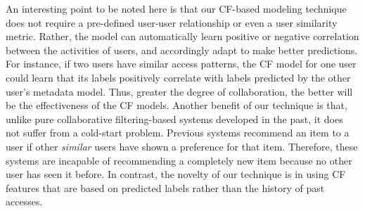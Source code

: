 An interesting point to be noted here is that our CF-based modeling
technique does not require a pre-defined user-user relationship or
even a user similarity metric.  Rather, the model can automatically learn
positive or negative correlation between the activities of users, and
accordingly adapt to make better predictions.  For instance, if two
users have similar access patterns, the CF model for one user could
learn that its labels positively correlate with labels predicted by
the other user's metadata model.  Thus, greater the degree of
collaboration, the better will be the effectiveness of the CF models.
Another benefit of our technique is that, unlike pure collaborative
filtering-based systems developed in the past, it does not suffer from
a cold-start problem.  Previous systems recommend an item to a user if
other \textit{similar} users have shown a preference for that item.
Therefore, these systems are incapable of recommending a completely
new item because no other user has seen it before.  In contrast, the
novelty of our technique is in using CF features that are based on
predicted labels rather than the history of past accesses.


